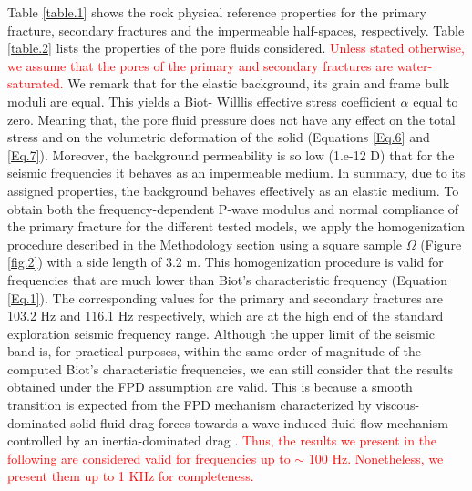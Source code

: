 \documentclass[draft]{agujournal2019}
\newcommand{\red}{\textcolor{red}}
\begin{document}
Table \ref{table.1} shows the rock physical reference properties for the primary fracture, secondary fractures and the impermeable half-spaces, respectively. Table \ref{table.2} lists the properties of the pore fluids considered.
\red{
Unless stated otherwise, we assume that the pores of the primary and secondary fractures are water-saturated.}
We remark that for the elastic background, its grain and frame bulk moduli are equal. This yields a Biot- Willlis effective stress coefficient $\alpha$ equal to zero. Meaning that, the pore fluid pressure does not have any effect on the total stress and on the volumetric deformation of the solid (Equations \eqref{Eq.6} and \eqref{Eq.7}). Moreover, the background permeability is so low (1.e-12 D) that for the seismic frequencies it behaves as an impermeable medium. In summary, due to its assigned properties, the background behaves effectively as an elastic medium.
To obtain both the frequency-dependent P-wave modulus and normal compliance of the primary fracture for the different tested models,  we apply the homogenization procedure described in the Methodology section using a square sample $\Omega$ (Figure \ref{fig.2}) with a side length of 3.2 m. This homogenization procedure is valid for frequencies that are much lower than Biot's characteristic frequency (Equation \eqref{Eq.1}). The corresponding values for the primary and secondary fractures are 103.2 Hz and 116.1 Hz respectively, which are at the high end of the standard exploration seismic frequency range. Although the upper limit of the seismic band is, for practical purposes, within the same order-of-magnitude of the computed Biot's characteristic frequencies, we can still consider that the results obtained under the FPD assumption are valid. This is because a smooth transition is expected from the FPD mechanism characterized by viscous-dominated solid-fluid drag forces towards a wave induced fluid-flow mechanism controlled by an inertia-dominated drag \cite{Rubino2014}. 
\red{
Thus, the results we present in the following are considered valid for frequencies up to $\sim$ 100 Hz. Nonetheless, we present them up to 1 KHz for completeness.
}
\end{document}
